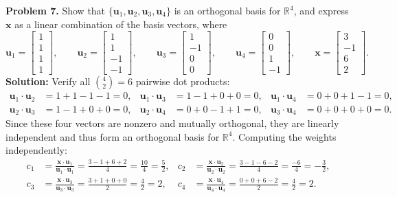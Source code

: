 \documentclass[11pt, letterpaper]{article}
\theoremstyle{definition}
\theoremstyle{remark}
\begin{document}
\textbf{Problem 7.} Show that $\{\mathbf{u}_1, \mathbf{u}_2, \mathbf{u}_3, \mathbf{u}_4\}$ is an orthogonal basis for $\mathbb{R}^4$, and express $\mathbf{x}$ as a linear combination of the basis vectors, where
\[
\mathbf{u}_1 = \begin{bmatrix} 1 \\ 1 \\ 1 \\ 1 \end{bmatrix}, \qquad
\mathbf{u}_2 = \begin{bmatrix} 1 \\ 1 \\ -1 \\ -1 \end{bmatrix}, \qquad
\mathbf{u}_3 = \begin{bmatrix} 1 \\ -1 \\ 0 \\ 0 \end{bmatrix}, \qquad
\mathbf{u}_4 = \begin{bmatrix} 0 \\ 0 \\ 1 \\ -1 \end{bmatrix}, \qquad
\mathbf{x} = \begin{bmatrix} 3 \\ -1 \\ 6 \\ 2 \end{bmatrix}.
\]
\textbf{Solution:} Verify all $\binom{4}{2} = 6$ pairwise dot products:
\begin{align*}
\mathbf{u}_1 \cdot \mathbf{u}_2 &= 1 + 1 - 1 - 1 = 0, &
\mathbf{u}_1 \cdot \mathbf{u}_3 &= 1 - 1 + 0 + 0 = 0, &
\mathbf{u}_1 \cdot \mathbf{u}_4 &= 0 + 0 + 1 - 1 = 0, \\
\mathbf{u}_2 \cdot \mathbf{u}_3 &= 1 - 1 + 0 + 0 = 0, &
\mathbf{u}_2 \cdot \mathbf{u}_4 &= 0 + 0 - 1 + 1 = 0, &
\mathbf{u}_3 \cdot \mathbf{u}_4 &= 0 + 0 + 0 + 0 = 0.
\end{align*}
Since these four vectors are nonzero and mutually orthogonal, they are linearly independent and thus form an orthogonal basis for $\mathbb{R}^4$. Computing the weights independently:
\begin{align*}
c_1 &= \frac{\mathbf{x} \cdot \mathbf{u}_1}{\mathbf{u}_1 \cdot \mathbf{u}_1} = \frac{3 - 1 + 6 + 2}{4} = \frac{10}{4} = \frac{5}{2}, &
c_2 &= \frac{\mathbf{x} \cdot \mathbf{u}_2}{\mathbf{u}_2 \cdot \mathbf{u}_2} = \frac{3 - 1 - 6 - 2}{4} = \frac{-6}{4} = -\frac{3}{2}, \\
c_3 &= \frac{\mathbf{x} \cdot \mathbf{u}_3}{\mathbf{u}_3 \cdot \mathbf{u}_3} = \frac{3 + 1 + 0 + 0}{2} = \frac{4}{2} = 2, &
c_4 &= \frac{\mathbf{x} \cdot \mathbf{u}_4}{\mathbf{u}_4 \cdot \mathbf{u}_4} = \frac{0 + 0 + 6 - 2}{2} = \frac{4}{2} = 2.
\end{align*}
\end{document}
